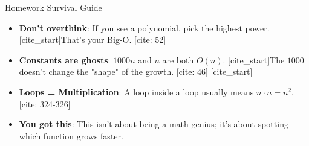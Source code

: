 \documentclass[landscape]{beamer}
\begin{document}
\begin{frame}{Homework Survival Guide}
    \begin{itemize}
        \item \textbf{Don't overthink}: If you see a polynomial, pick the highest power. [cite_start]That's your Big-O. [cite: 52]
        \item \textbf{Constants are ghosts}: $1000n$ and $n$ are both $O(n)$. [cite_start]The $1000$ doesn't change the "shape" of the growth. [cite: 46]
        [cite_start]\item \textbf{Loops = Multiplication}: A loop inside a loop usually means $n \cdot n = n^2$. [cite: 324-326]
        \item \textbf{You got this}: This isn't about being a math genius; it's about spotting which function grows faster.
    \end{itemize}
\end{frame}
\end{document}
